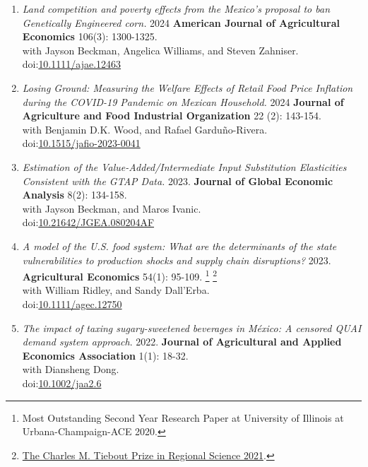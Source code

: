 \documentclass[11pt]{article}
\makeatletter
\newlength{\bibhang}
\newlength{\bibsep}
 {\@listi \global\bibsep\itemsep \global\advance\bibsep by\parsep}
\newenvironment{bibsection}%
        {\begin{enumerate}{}{%
       \setlength{\leftmargin}{\bibhang}%
       \setlength{\itemindent}{-\leftmargin}%
       \setlength{\itemsep}{\bibsep}%
       \setlength{\parsep}{\z@}%
        \setlength{\partopsep}{0pt}%
        \setlength{\topsep}{0pt}}}
        {\end{enumerate}\vspace{-.6\baselineskip}}
\newcommand\doilink[1]{\href{http://dx.doi.org/#1}{#1}}
\newcommand\doi[1]{doi:\doilink{#1}}
\makeatother
\begin{document}
\begin{bibsection}

	\item {\textit{Land competition and poverty effects from the Mexico's proposal to ban Genetically Engineered corn.}} 2024
	\textbf{American Journal of Agricultural Economics} 106(3): 1300-1325.
	\\with Jayson Beckman, Angelica Williams, and Steven Zahniser.
	\\doi:\doilink{10.1111/ajae.12463}

	\item {\textit{Losing Ground: Measuring the Welfare Effects of Retail Food Price Inflation during the COVID-19 Pandemic on Mexican Household.}} 2024
	 \textbf{Journal of Agriculture and Food Industrial Organization} 22 (2): 143-154.
	\\ with Benjamin D.K. Wood, and Rafael Garduño-Rivera.
		\\doi:\doilink{10.1515/jafio-2023-0041}

	\item \textit{Estimation of the Value-Added/Intermediate Input Substitution Elasticities Consistent with the GTAP Data.} 2023.
	\textbf{Journal of Global Economic Analysis} 8(2): 134-158.
	\\with Jayson Beckman, and Maros Ivanic.
	\\doi:\doilink{10.21642/JGEA.080204AF}

	   \item \textit{A model of the U.S. food system: What are the determinants of the state vulnerabilities to production shocks and supply chain disruptions?} 2023.  \textbf{Agricultural Economics} 54(1): 95-109. \footnote{Most Outstanding Second Year Research Paper at University of Illinois at Urbana-Champaign-ACE 2020.} \footnote{\href{https://www.wrsaonline.org/newsite/tiebout-prize/}{The Charles M. Tiebout Prize in Regional Science 2021}.}
	\\ with William Ridley, and Sandy Dall'Erba.
	\\doi:\doilink{10.1111/agec.12750}

	\item \textit{The impact of taxing sugary-sweetened beverages in México: A censored QUAI demand system approach}. 2022.
	\textbf{Journal of Agricultural and Applied Economics Association} 1(1): 18-32.
	\\ with Diansheng Dong.
	\\doi:\doilink{10.1002/jaa2.6}


\end{bibsection}
\end{document}
